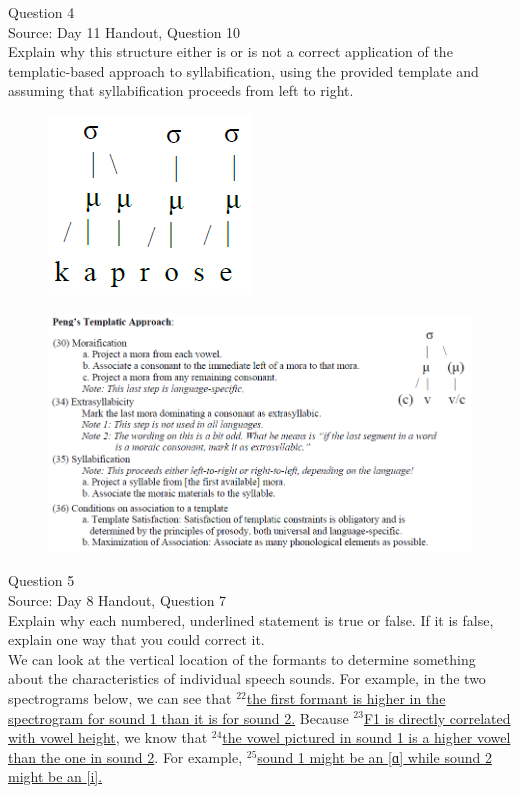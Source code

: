 \documentclass[12pt]{article}
\begin{document}
{\large Question 4}\\

Source: Day 11 Handout, Question 10\\

Explain why this structure either is or is not a correct application of the templatic-based approach to syllabification, using the provided template and assuming that syllabification proceeds from left to right.\\

\begin{figure}[H]
\includegraphics{../images/pengtemplate_kaprose_yes.png}
\end{figure}
\begin{figure}[H]
\includegraphics{../images/peng_template_withdiagram.png}
\end{figure}

\newpage

{\large Question 5}\\

Source: Day 8 Handout, Question 7\\

Explain why each numbered, underlined statement is true or false. If it is false, explain one way that you could correct it.\\

We can look at the vertical location of the formants to determine something about the characteristics of individual speech sounds. For example, in the two spectrograms below, we can see that $^{22}$\ul{the first formant is higher in the spectrogram for sound 1 than it is for sound 2.} Because $^{23}$\ul{F1 is directly correlated with vowel height}, we know that $^{24}$\ul{the vowel pictured in sound 1 is a higher vowel than the one in sound 2}. For example, $^{25}$\ul{sound 1 might be an {[ɑ]} while sound 2 might be an {[i]}.}
\end{document}
